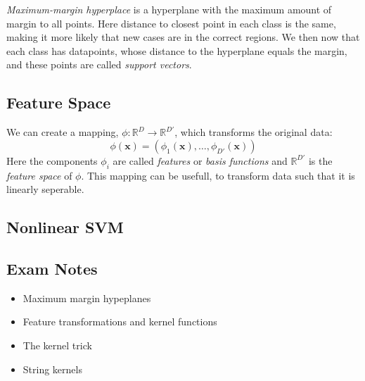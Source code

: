 \emph{Maximum-margin hyperplace} is a hyperplane with the maximum amount of margin to all points.
Here distance to closest point in each class is the same, making it more likely that new cases are in the correct regions.
We then now that each class has datapoints, whose distance to the hyperplane equals the margin, and these points are called \emph{support vectors}.


\subsection{Feature Space}

We can create a mapping, $\phi : \mathbb{R}^D \rightarrow \mathbb{R}^{D'}$, which transforms the original data:
\[
    \phi(\mathbf{x}) = (\phi_1(\mathbf{x}), \dots, \phi_{D'}(\mathbf{x}))
\]
Here the components $\phi_i$ are called \emph{features} or \emph{basis functions} and $\mathbb{R}^{D'}$ is the \emph{feature space} of $\phi$.
This mapping can be usefull, to transform data such that it is linearly seperable.

\subsection{Nonlinear SVM}

\subsection{Exam Notes}

\begin{itemize}
    \item Maximum margin hypeplanes
    \item Feature transformations and kernel functions
    \item The kernel trick
    \item String kernels
\end{itemize}

